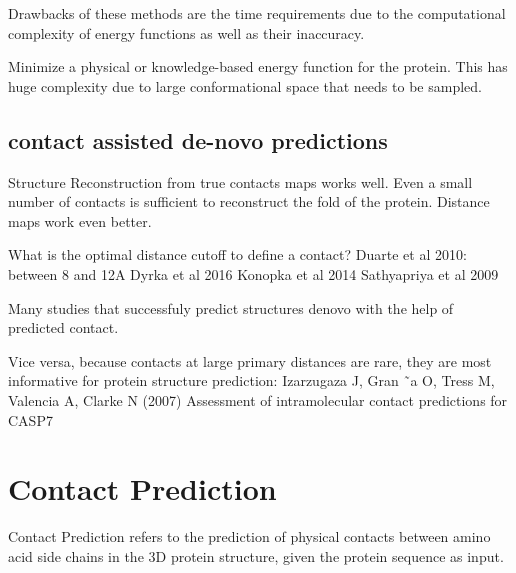 \documentclass[12pt,a4paper,twoside]{book}
\theoremstyle{definition}
\theoremstyle{definition}
\theoremstyle{remark}
\begin{document}
Drawbacks of these methods are the time requirements due to the
computational complexity of energy functions as well as their
inaccuracy.

Minimize a physical or knowledge-based energy function for the protein.
This has huge complexity due to large conformational space that needs to
be sampled.

\subsection{contact assisted de-novo
predictions}\label{contact-assisted-str-pred}

Structure Reconstruction from true contacts maps works well. Even a
small number of contacts is sufficient to reconstruct the fold of the
protein. Distance maps work even better.

What is the optimal distance cutoff to define a contact? Duarte et al
2010: between 8 and 12A Dyrka et al 2016 Konopka et al 2014 Sathyapriya
et al 2009

Many studies that successfuly predict structures denovo with the help of
predicted contact.

Vice versa, because contacts at large primary distances are rare, they
are most informative for protein structure prediction: Izarzugaza J,
Gran ˜a O, Tress M, Valencia A, Clarke N (2007) Assessment of
intramolecular contact predictions for CASP7

\section{Contact Prediction}\label{contact-prediction}

Contact Prediction refers to the prediction of physical contacts between
amino acid side chains in the 3D protein structure, given the protein
sequence as input.
\end{document}
